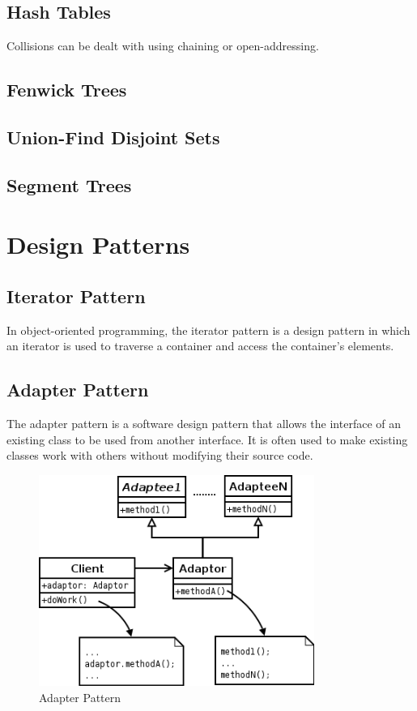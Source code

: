 \documentclass[a4paper, 12pt]{article}
\begin{document}
	\subsection{Hash Tables}

Collisions can be dealt with using chaining or open-addressing.

  \subsection{Fenwick Trees}

  \subsection{Union-Find Disjoint Sets}

  \subsection{Segment Trees}
	
\section{Design Patterns}

	\subsection{Iterator Pattern}
	
In object-oriented programming, the iterator pattern is a design pattern in which an iterator is used to traverse a container and access the container's elements.

	\subsection{Adapter Pattern}
	
The adapter pattern is a software design pattern that allows the interface of an existing class to be used from another interface. It is often used to make existing classes work with others without modifying their source code.

\begin{figure}[!h]
	\center\includegraphics[width=9cm]{figures/adapter.png}
	\caption{Adapter Pattern}
\end{figure}
\end{document}
